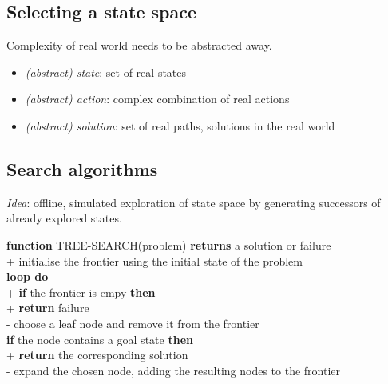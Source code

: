 \documentclass{article}
\begin{document}
\subsection{Selecting a state space}

Complexity of real world needs to be abstracted away.
\begin{itemize}
    \item \emph{(abstract) state}: set of real states
    \item \emph{(abstract) action}: complex combination of real actions
    \item \emph{(abstract) solution}: set of real paths, solutions in the real world
\end{itemize}

\subsection{Search algorithms}

\emph{Idea}: offline, simulated exploration of state space by generating successors of already
explored states.

\begin{pseudo}
\textbf{function} TREE-SEARCH(problem) \textbf{returns} a solution or failure   \\+
    initialise the frontier using the initial state of the problem              \\
    \textbf{loop do}                                                            \\+
        \textbf{if} the frontier is empy \textbf{then}                          \\+
            \textbf{return} failure                                             \\-
        choose a leaf node and remove it from the frontier                      \\
        \textbf{if} the node contains a goal state \textbf{then}                \\+
            \textbf{return} the corresponding solution                          \\-
        expand the chosen node, adding the resulting nodes to the frontier
\end{pseudo}
\end{document}
